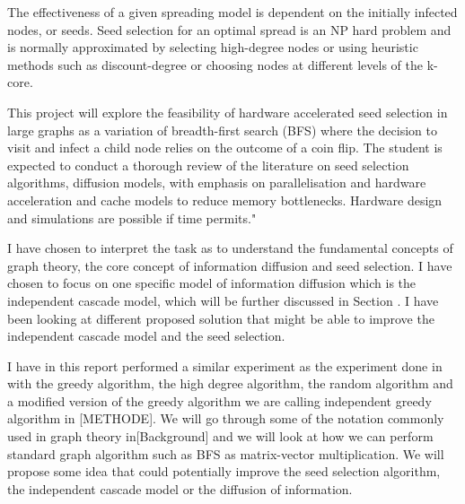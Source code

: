 The effectiveness of a given spreading model is dependent on the initially infected nodes, or seeds. Seed selection for an optimal spread is an NP hard problem and is normally approximated by selecting high-degree nodes or using heuristic methods such as discount-degree or choosing nodes at different levels of the k-core.

This project will explore the feasibility of hardware accelerated seed selection in large graphs as a variation of breadth-first search (BFS) where the decision to visit and infect a child node relies on the outcome of a coin flip. The student is expected to conduct a thorough review of the literature on seed selection algorithms, diffusion models, with emphasis on parallelisation and hardware acceleration and cache models to reduce memory bottlenecks. Hardware design and simulations are possible if time permits."

I have chosen to interpret the task as to understand the fundamental concepts of graph theory, the core concept of information diffusion and seed selection. I have chosen to focus on one specific model of information diffusion which is the independent cascade model, which will be further discussed in Section \label{background}. I have been looking at different proposed solution that might be able to improve the independent cascade model and the seed selection.

I have in this report performed a similar experiment as the experiment done in \cite{Maximizespread2003} with the greedy algorithm, the high degree algorithm, the random algorithm and a modified version of the greedy algorithm we are calling independent greedy algorithm in [METHODE]. We will go through some of the notation commonly used in graph theory in[Background] and we will look at how we can perform standard graph algorithm such as BFS as matrix-vector multiplication. We will propose some idea that could potentially improve the seed selection algorithm, the independent cascade model or the diffusion of information. 
